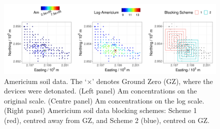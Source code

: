 \documentclass[article]{jss}
\newcommand{\red}[1]{\textcolor{red}{#1}}
\begin{document}
\begin{figure}
    \centering
    \includegraphics[width = \linewidth]{img/Am_data_and_blocks.png}
    \caption{Americium soil data. The `$\times$' denotes Ground Zero (GZ), where the devices were detonated. (Left panel) Am concentrations on the original scale. (Centre panel) Am concentrations on the log scale. (Right panel) Americium soil data blocking schemes: Scheme 1 (red), centred away from GZ, and Scheme 2 (blue), centred on GZ. 
}   
  \label{fig:Am_data}
\end{figure}
\end{document}
